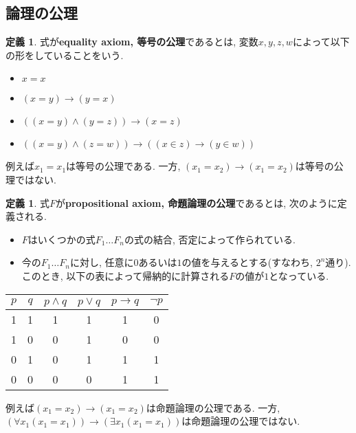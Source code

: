 \documentclass[a4paper]{bxjsarticle}
\theoremstyle{definition}
\newtheorem{defn}[thm]{定義}
\begin{document}
    \subsection{論理の公理}
    \begin{defn}
        式が\textbf{equality axiom, 等号の公理}であるとは, 変数$x,y,z,w$によって以下の形をしていることをいう.
        \begin{itemize}
            \item $x=x$
            \item $(x=y) \to (y=x)$
            \item $((x=y) \land (y=z)) \to (x=z)$
            \item $((x=y) \land (z=w)) \to ((x \in z) \to (y \in w))$
            
            
        \end{itemize}
        
        例えば$x_1 = x_1$は等号の公理である. 一方, $(x_1 = x_2) \to (x_1 = x_2)$は等号の公理ではない. 
    \end{defn}
    \begin{defn}
        式$F$が\textbf{propositional axiom, 命題論理の公理}であるとは, 次のように定義される.
        
        \begin{itemize}
            \item $F$はいくつかの式$F_1 \dots F_n$の式の結合, 否定によって作られている.
            \item 今の$F_1 \dots F_n$に対し, 任意に$0$あるいは$1$の値を与えるとする(すなわち, $2^n$通り). このとき, 以下の表によって帰納的に計算される$F$の値が$1$となっている.
        \end{itemize}
        
        \begin{table}[htbp]
            \centering
            \begin{tabular}{c|c|c|c|c|c}
                $p$ & $q$ & $p \land q$ & $p \lor q$ & $p \to q$ & $\lnot p$ \\ \hline
                1 & 1 & 1 & 1 & 1 & 0 \\ \hline
                1 & 0 & 0 & 1 & 0 & 0 \\ \hline
                0 & 1 & 0 & 1 & 1 & 1 \\ \hline
                0 & 0 & 0 & 0 & 1 & 1 \\ \hline
            \end{tabular}
        \end{table}
        
        例えば$(x_1 = x_2) \to (x_1 = x_2)$は命題論理の公理である. 一方, $(\forall x_1 (x_1 = x_1)) \to (\exists x_1 (x_1 = x_1))$は命題論理の公理ではない.
    \end{defn}
\end{document}
